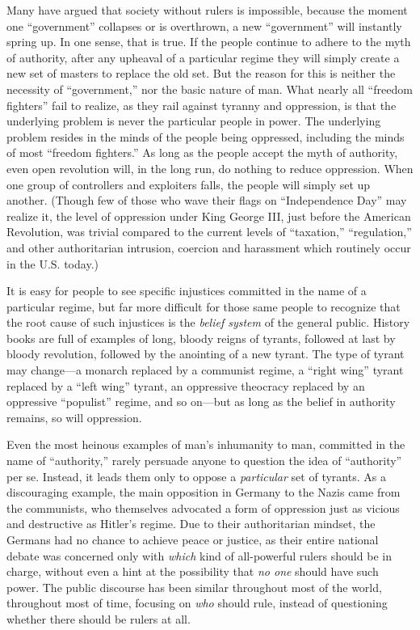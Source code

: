\documentclass{book}
\begin{document}
Many have argued that society without rulers is impossible, because the moment one \enquote{government} collapses or is overthrown, a new \enquote{government} will instantly spring up. In one sense, that is true. If the people continue to adhere to the myth of authority, after any upheaval of a particular regime they will simply create a new set of masters to replace the old set. But the reason for this is neither the necessity of \enquote{government,} nor the basic nature of man. What nearly all \enquote{freedom fighters} fail to realize, as they rail against tyranny and oppression, is that the underlying problem is never the particular people in power. The underlying problem resides in the minds of the people being oppressed, including the minds of most \enquote{freedom fighters.} As long as the people accept the myth of authority, even open revolution will, in the long run, do nothing to reduce oppression. When one group of controllers and exploiters falls, the people will simply set up another. (Though few of those who wave their flags on \enquote{Independence Day} may realize it, the level of oppression under King George III, just before the American Revolution, was trivial compared to the current levels of \enquote{taxation,} \enquote{regulation,} and other authoritarian intrusion, coercion and harassment which routinely occur in the U.S. today.)

It is easy for people to see specific injustices committed in the name of a particular regime, but far more difficult for those same people to recognize that the root cause of such injustices is the \emph{belief system} of the general public. History books are full of examples of long, bloody reigns of tyrants, followed at last by bloody revolution, followed by the anointing of a new tyrant. The type of tyrant may change---a monarch replaced by a communist regime, a \enquote{right wing} tyrant replaced by a \enquote{left wing} tyrant, an oppressive theocracy replaced by an oppressive \enquote{populist} regime, and so on---but as long as the belief in authority remains, so will oppression.

Even the most heinous examples of man's inhumanity to man, committed in the name of \enquote{authority,} rarely persuade anyone to question the idea of \enquote{authority} per se. Instead, it leads them only to oppose a \emph{particular} set of tyrants. As a discouraging example, the main opposition in Germany to the Nazis came from the communists, who themselves advocated a form of oppression just as vicious and destructive as Hitler's regime. Due to their authoritarian mindset, the Germans had no chance to achieve peace or justice, as their entire national debate was concerned only with \emph{which} kind of all-powerful rulers should be in charge, without even a hint at the possibility that \emph{no one} should have such power. The public discourse has been similar throughout most of the world, throughout most of time, focusing on \emph{who} should rule, instead of questioning whether there should be rulers at all.
\end{document}
